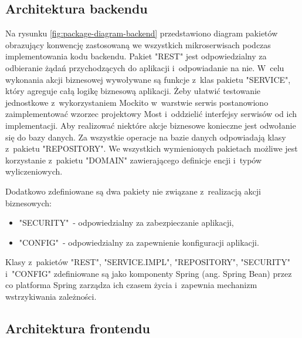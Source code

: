 
\subsection{Architektura backendu}\label{subsec:system-architecture:backend}


Na rysunku \ref{fig:package-diagram-backend} przedstawiono diagram pakietów obrazujący konwencję zastosowaną we wszystkich mikroserwisach podczas implementowania kodu backendu.
Pakiet "REST" jest odpowiedzialny za odbieranie żądań przychodzących do aplikacji i~odpowiadanie na nie.
W~celu wykonania akcji biznesowej wywoływane są funkcje z~klas pakietu "SERVICE", który agreguje całą logikę biznesową aplikacji.
Żeby ułatwić testowanie jednostkowe z~wykorzystaniem Mockito w~warstwie serwis postanowiono zaimplementować wzorzec projektowy Most\cite{book:wzorce-projektowe} i~oddzielić interfejsy serwisów od ich implementacji.
Aby realizować niektóre akcje biznesowe konieczne jest odwołanie się do bazy danych.
Za wszystkie operacje na bazie danych odpowiadają klasy z~pakietu "REPOSITORY".
We wszystkich wymienionych pakietach możliwe jest korzystanie z~pakietu "DOMAIN" zawierającego definicje encji i~typów wyliczeniowych.

\par
Dodatkowo zdefiniowane są dwa pakiety nie związane z~realizacją akcji biznesowych:
\begin{itemize}
    \item "SECURITY"~- odpowiedzialny za zabezpieczanie aplikacji,
    \item "CONFIG"~- odpowiedzialny za zapewnienie konfiguracji aplikacji.
\end{itemize}

\par
Klasy z~pakietów "REST", "SERVICE.IMPL", "REPOSITORY", "SECURITY" i~"CONFIG" zdefiniowane są jako komponenty Spring (ang. Spring Bean) przez co platforma Spring zarządza ich czasem życia i~zapewnia mechanizm wstrzykiwania zależności\cite{book:spring-w-akcji}.

\subsection{Architektura frontendu}\label{subsec:system-architecture:frontend}

